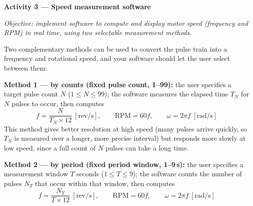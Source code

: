 \begin{procedure}
  \begin{boxedfigure}
    \centering
    \label{fig:exp7rpi-signalpath}
  \end{boxedfigure}
  \vspace*{1.5em}

  \textbf{Activity 3 --- Speed measurement software}\vspace{2pt}

  \textit{Objective: implement software to compute and display motor speed (frequency and RPM) in real time, using two selectable measurement methods.}

  Two complementary methods can be used to convert the pulse train into a frequency and rotational speed, and your software should let the user select between them:
  \vspace*{1.5em}

  \textbf{Method 1 --- by counts (fixed pulse count, 1--99):} the user specifies a target pulse count $N$ ($1 \leq N \leq 99$); the software measures the elapsed time $T_N$ for $N$ pulses to occur, then computes
  \[
    f = \frac{N}{T_N \times 12} \ \left[\text{rev/s}\right], \qquad
    \text{RPM} = 60f, \qquad
    \omega = 2\pi f \ \left[\text{rad/s}\right]
  \]
  This method gives better resolution at high speed (many pulses arrive quickly, so $T_N$ is measured over a longer, more precise interval) but responds more slowly at low speed, since a full count of $N$ pulses can take a long time.
  \vspace*{1.5em}

  \textbf{Method 2 --- by period (fixed period window, 1--9\,s):} the user specifies a measurement window $T$ seconds ($1 \leq T \leq 9$); the software counts the number of pulses $N_T$ that occur within that window, then computes
  \[
    f = \frac{N_T}{T \times 12} \ \left[\text{rev/s}\right], \qquad
    \text{RPM} = 60f, \qquad
    \omega = 2\pi f \ \left[\text{rad/s}\right]
  \]
  \newpage


\end{procedure}
